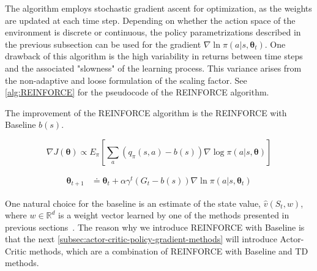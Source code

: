 \documentclass[../xlapes02]{subfiles}
\begin{document}
    The algorithm employs stochastic gradient ascent for optimization, as the weights are updated at each time step. Depending on whether the action space of the environment is discrete or continuous, the policy parametrizations described in the previous subsection can be used for the gradient $\nabla\ln\pi(a|s,\bm{\theta}_t)$. One drawback of this algorithm is the high variability in returns between time steps and the associated "slowness" of the learning process. This variance arises from the non-adaptive and loose formulation of the scaling factor. See \cref{alg:REINFORCE} for the pseudocode of the REINFORCE algorithm.

    The improvement of the REINFORCE algorithm is the REINFORCE with Baseline $b(s)$.

    \begin{equation}
        \nabla J(\bm{\theta})\propto E_{\pi}\left[\sum_{a}(q_\pi(s,a)-b(s))\nabla\log\pi(a|s,\bm{\theta})\right]
    \end{equation}

    \begin{equation}
        \begin{split}
            \bm{\theta}_{t+1}&\doteq\bm{\theta}_{t}+\alpha\gamma^t (G_t-b(s)) \nabla\ln\pi(a|s,\bm{\theta}_t)
        \end{split}
        \label{eq:REINFORCE_with_baseline}
    \end{equation}

    One natural choice for the baseline is an estimate of the state value, $\hat{v}(S_t, w)$, where $w \in \mathbb{R}^d$ is a weight vector learned by one of the methods presented in previous sections~\cite{FITMT25127, sutton2018reinforcement, rl-course-david-silver}. The reason why we introduce REINFORCE with Baseline is that the next \cref{subsec:actor-critic-policy-gradient-methods} will introduce Actor-Critic methods, which are a combination of REINFORCE with Baseline and TD methods.
\end{document}
